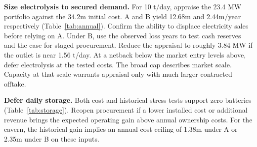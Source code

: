 \textbf{Size electrolysis to secured demand.}
For 10 t/day, appraise the 23.4 MW portfolio against the \gbp 34.2m
initial cost. A and B yield \gbp 12.68m and \gbp 2.44m/year respectively
(Table~\ref{tab:annual}). Confirm the ability to displace electricity
sales before relying on A. Under B, use the observed loss years to test
cash reserves and the case for staged procurement. Reduce the appraisal to roughly
3.84 MW if the outlet is near 1.56 t/day. At a netback below the
market entry levels above, defer electrolysis at the tested costs.
The broad cap describes market scale. Capacity at that scale warrants
appraisal only with much larger contracted offtake.

\textbf{Defer daily storage.}
Both cost and historical stress tests support zero batteries
(Table~\ref{tab:storage}). Reopen procurement if a lower installed cost
or additional revenue brings the expected operating gain above annual
ownership costs. For the cavern, the historical gain implies an annual
cost ceiling of \gbp 1.38m under A or \gbp 2.35m under B on these inputs.
